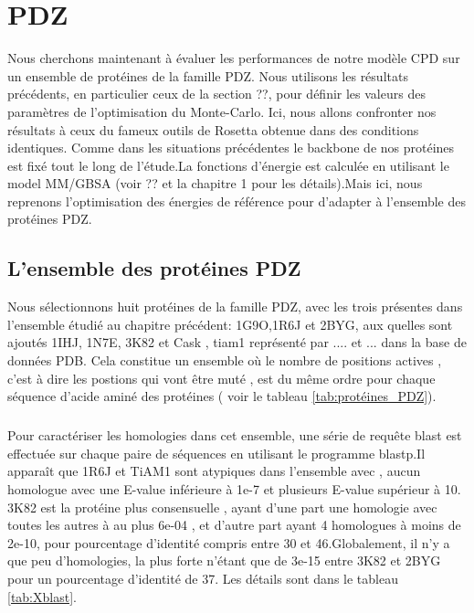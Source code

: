 \chapter{PDZ}
\label{chap:PDZ}

Nous cherchons maintenant à évaluer les performances de notre modèle CPD sur un ensemble de protéines de la famille PDZ. Nous utilisons les résultats précédents, en particulier ceux de la section ??, pour définir les valeurs des paramètres de l'optimisation du Monte-Carlo.  Ici, nous allons confronter nos résultats à ceux  du fameux outils de Rosetta obtenue dans des conditions identiques. Comme dans les situations précédentes le backbone de nos protéines est fixé tout le long de l'étude.La fonctions d'énergie est calculée en utilisant le model MM/GBSA (voir ?? et la chapitre 1 pour les détails).Mais ici, nous reprenons l'optimisation des énergies de référence pour d'adapter à l'ensemble des protéines PDZ.


\section{L'ensemble des protéines PDZ} 

Nous sélectionnons huit protéines de la famille PDZ, avec les trois présentes dans l'ensemble étudié au chapitre précédent: 1G9O,1R6J et 2BYG, aux quelles sont ajoutés 1IHJ, 1N7E, 3K82 et Cask , tiam1 représenté par .... et ... dans la base de données PDB. Cela constitue un ensemble où le nombre de positions actives , c'est à dire les postions qui vont être muté , est du même ordre pour chaque séquence d'acide aminé des protéines ( voir le tableau \ref{tab:protéines_PDZ}).

\paragraph{}
Pour caractériser les homologies dans cet ensemble, une série de requête blast est effectuée sur chaque paire de séquences en utilisant le programme blastp.Il apparaît que 1R6J et TiAM1 sont atypiques dans l'ensemble avec , aucun homologue avec une E-value inférieure à 1e-7 et plusieurs E-value supérieur à 10. 3K82 est la protéine plus consensuelle , ayant d'une part une homologie avec toutes les autres à au plus 6e-04 , et d'autre part ayant 4 homologues à moins de 2e-10, pour pourcentage d'identité compris entre 30 et 46.Globalement, il n'y a que peu d'homologies, la plus forte n'étant que de 3e-15 entre 3K82 et 2BYG pour un pourcentage d'identité de 37. Les détails sont dans le tableau \ref{tab:Xblast}.

